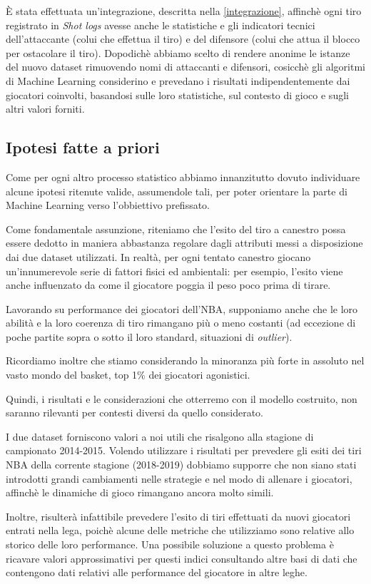 
È stata effettuata un’integrazione, descritta nella \autoref{integrazione},  affinchè ogni tiro registrato in \textit{Shot logs} avesse anche le statistiche e gli indicatori tecnici dell’attaccante (colui che effettua il tiro) e del difensore (colui che attua il blocco per ostacolare il tiro). Dopodichè abbiamo scelto di rendere anonime le istanze del nuovo dataset rimuovendo nomi di attaccanti e difensori, cosicchè gli algoritmi di Machine Learning considerino e prevedano i risultati indipendentemente dai giocatori coinvolti, basandosi sulle loro statistiche, sul contesto di gioco e sugli altri valori forniti.

\subsection{Ipotesi fatte a priori}

Come per ogni altro processo statistico abbiamo innanzitutto dovuto individuare alcune ipotesi ritenute valide, assumendole tali, per poter orientare la parte di Machine Learning verso l’obbiettivo prefissato.
\par
Come fondamentale assunzione, riteniamo che l’esito del tiro a canestro possa essere dedotto in maniera abbastanza regolare dagli  attributi messi a disposizione dai due dataset utilizzati. In realtà, per ogni tentato canestro giocano un’innumerevole serie di fattori fisici ed ambientali: per esempio, l’esito viene anche influenzato da come il giocatore poggia il peso poco prima di tirare.
\par
Lavorando su performance dei giocatori dell’NBA, supponiamo anche che le loro abilità e la loro coerenza di tiro rimangano più o meno costanti (ad eccezione di poche partite sopra o sotto il loro standard, situazioni di \textit{outlier}).
\par
Ricordiamo inoltre che stiamo considerando la minoranza più forte in assoluto nel vasto mondo del basket, top 1\% dei giocatori agonistici. 
\par
\par
Quindi, i risultati e le considerazioni che otterremo con il modello costruito, non saranno rilevanti per contesti diversi da quello considerato.
\par
I due dataset forniscono valori a noi utili che risalgono alla stagione di campionato 2014-2015. Volendo utilizzare i risultati per prevedere gli esiti dei tiri NBA della corrente stagione (2018-2019) dobbiamo supporre che non siano stati introdotti grandi cambiamenti nelle strategie e nel modo di allenare i giocatori, affinchè le dinamiche di gioco rimangano ancora molto simili.
\par
Inoltre, risulterà infattibile prevedere l’esito di tiri effettuati da nuovi giocatori entrati nella lega, poichè alcune delle metriche che utilizziamo sono relative allo storico delle loro performance. 
Una possibile soluzione a questo problema è ricavare valori approssimativi per questi indici consultando altre basi di dati che contengono dati relativi alle performance del giocatore in altre leghe.

